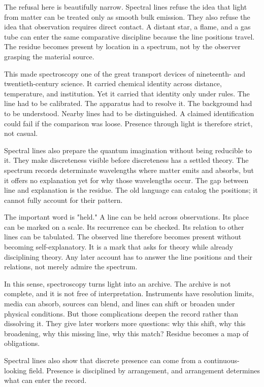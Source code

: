 The refusal here is beautifully narrow. Spectral lines refuse the idea that
light from matter can be treated only as smooth bulk emission. They also
refuse the idea that observation requires direct contact. A distant star, a
flame, and a gas tube can enter the same comparative discipline because the
line positions travel. The residue becomes present by location in a spectrum,
not by the observer grasping the material source.

This made spectroscopy one of the great transport devices of nineteenth- and
twentieth-century science. It carried chemical identity across distance,
temperature, and institution. Yet it carried that identity only under rules.
The line had to be calibrated. The apparatus had to resolve it. The background
had to be understood. Nearby lines had to be distinguished. A claimed
identification could fail if the comparison was loose. Presence through light
is therefore strict, not casual.

Spectral lines also prepare the quantum imagination without being reducible
to it. They make discreteness visible before discreteness has a settled
theory. The spectrum records determinate wavelengths where matter emits and absorbs,
but it offers no explanation yet for why those wavelengths occur. The gap between line and
explanation is the residue. The old language can catalog the positions; it
cannot fully account for their pattern.

The important word is "held." A line can be held across observations. Its
place can be marked on a scale. Its recurrence can be checked. Its relation
to other lines can be tabulated. The observed line therefore becomes present
without becoming self-explanatory. It is a mark that asks for theory while
already disciplining theory. Any later account has to answer the line positions
and their relations, not merely admire the spectrum.

In this sense, spectroscopy turns light into an archive. The archive is not
complete, and it is not free of interpretation. Instruments have resolution
limits, media can absorb, sources can blend, and lines can shift or broaden
under physical conditions. But those complications deepen the record rather
than dissolving it. They give later workers more questions: why this shift,
why this broadening, why this missing line, why this match? Residue becomes a
map of obligations.

Spectral lines also show that discrete presence can come from a
continuous-looking field. Presence is disciplined by arrangement, and
arrangement determines what can enter the record.

